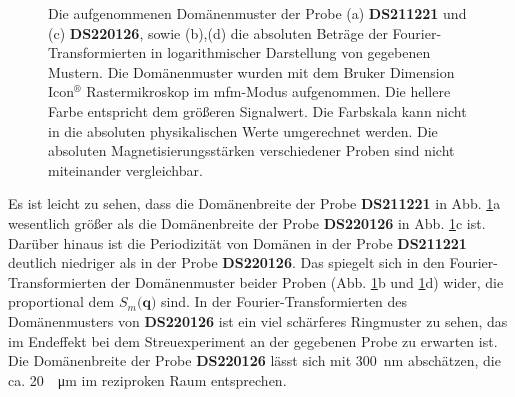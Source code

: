 \begin{figure}[H]
    \centering
    
    \caption{Die aufgenommenen Domänenmuster der Probe (a) \textbf{DS211221} und (c) \textbf{DS220126}, sowie (b),(d) die absoluten Beträge der Fourier-Transformierten in logarithmischer Darstellung von gegebenen Mustern. Die Domänenmuster wurden mit dem Bruker Dimension Icon$^{\text{®}}$ Rastermikroskop im \gls{mfm}-Modus aufgenommen. Die hellere Farbe entspricht dem größeren Signalwert. Die Farbskala kann nicht in die absoluten physikalischen Werte umgerechnet werden. Die absoluten Magnetisierungsstärken verschiedener Proben sind nicht miteinander vergleichbar.}
    \label{fig:mfm-amplitude-ft}
\end{figure}
\noindent
Es ist leicht zu sehen, dass die Domänenbreite der Probe \textbf{DS211221} in Abb. \ref{fig:mfm-amplitude-ft}a wesentlich größer als die Domänenbreite der Probe \textbf{DS220126} in Abb. \ref{fig:mfm-amplitude-ft}c ist. Darüber hinaus ist die Periodizität von Domänen in der Probe \textbf{DS211221} deutlich niedriger als in der Probe  \textbf{DS220126}. Das spiegelt sich in den Fourier-Transformierten der Domänenmuster beider Proben (Abb. \ref{fig:mfm-amplitude-ft}b und \ref{fig:mfm-amplitude-ft}d) wider, die proportional dem $S_m(\mathbf{q)}$ sind. In der Fourier-Transformierten des Domänenmusters von \textbf{DS220126} ist ein viel schärferes Ringmuster zu sehen, das im Endeffekt bei dem Streuexperiment an der gegebenen Probe zu erwarten ist. Die Domänenbreite der Probe \textbf{DS220126} lässt sich mit \SI{300}{\nano\meter} abschätzen, die ca. \SI{20}{\per\micro\meter} im reziproken Raum entsprechen.

